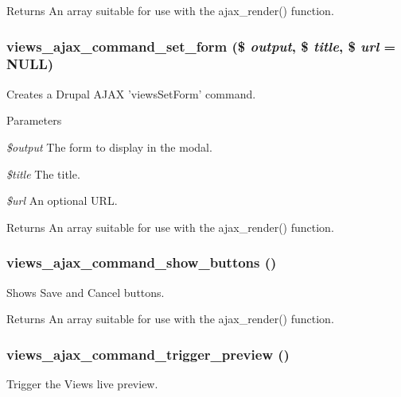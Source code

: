 \begin{DoxyReturn}{Returns}
An array suitable for use with the ajax\_\-render() function. 
\end{DoxyReturn}
\hypertarget{group__ajax_gac5062864272f5b8134072eb22a661e6f}{
\subsubsection[{views\_\-ajax\_\-command\_\-set\_\-form}]{\setlength{\rightskip}{0pt plus 5cm}views\_\-ajax\_\-command\_\-set\_\-form (\$ {\em output}, \/  \$ {\em title}, \/  \$ {\em url} = {\ttfamily NULL})}}
\label{group__ajax_gac5062864272f5b8134072eb22a661e6f}
Creates a Drupal AJAX 'viewsSetForm' command.


\begin{DoxyParams}{Parameters}
\item[{\em \$output}]The form to display in the modal. \item[{\em \$title}]The title. \item[{\em \$url}]An optional URL.\end{DoxyParams}
\begin{DoxyReturn}{Returns}
An array suitable for use with the ajax\_\-render() function. 
\end{DoxyReturn}
\hypertarget{group__ajax_ga3ef672bfe39df163a3cf89ed23c8a0c2}{
\subsubsection[{views\_\-ajax\_\-command\_\-show\_\-buttons}]{\setlength{\rightskip}{0pt plus 5cm}views\_\-ajax\_\-command\_\-show\_\-buttons ()}}
\label{group__ajax_ga3ef672bfe39df163a3cf89ed23c8a0c2}
Shows Save and Cancel buttons.

\begin{DoxyReturn}{Returns}
An array suitable for use with the ajax\_\-render() function. 
\end{DoxyReturn}
\hypertarget{group__ajax_ga698e1518b153b16adbe61e3aeb376eac}{
\subsubsection[{views\_\-ajax\_\-command\_\-trigger\_\-preview}]{\setlength{\rightskip}{0pt plus 5cm}views\_\-ajax\_\-command\_\-trigger\_\-preview ()}}
\label{group__ajax_ga698e1518b153b16adbe61e3aeb376eac}
Trigger the Views live preview.

